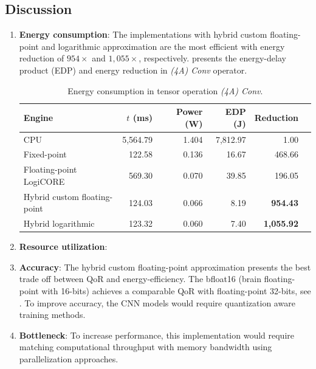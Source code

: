 \subsection{Discussion}
\begin{enumerate}

	\item{\textbf{Energy consumption}}: The implementations with hybrid custom floating-point and logarithmic approximation are the most efficient with energy reduction of $954\times$ and $1,055\times$, respectively.  presents the energy-delay product (EDP) and energy reduction in \emph{(4A) Conv} operator.
	
\begin{table}[!htp]\centering
	\caption{Energy consumption in tensor operation \emph{(4A) Conv}.}\label{tab:edp}
	\scriptsize
	\begin{tabular}{lrrrrr}\toprule
		\textbf{Engine} & \textbf{$t$ (ms)} &\textbf{Power (W)} &\textbf{EDP (J)} &\textbf{Reduction} \\\midrule
		CPU &5,564.79 &1.404 &7,812.97 &1.00 \\
		Fixed-point &122.58 &0.136 &16.67 &468.66 \\
		Floating-point LogiCORE &569.30 &0.070 &39.85 &196.05 \\
		Hybrid custom floating-point &124.03 &0.066 &8.19 &\textbf{954.43} \\
		Hybrid logarithmic &123.32 &0.060 &7.40 &\textbf{1,055.92 }\\
		\bottomrule
	\end{tabular}
\end{table}
	
	\item{\textbf{Resource utilization}}: 
	
	\item{\textbf{Accuracy}}: The hybrid custom floating-point approximation presents the best trade off between QoR and energy-efficiency. The bfloat16 (brain floating-point with 16-bits) achieves a comparable QoR with floating-point 32-bits, see . To improve accuracy, the CNN models would require quantization aware training methods.
	
	\item{\textbf{Bottleneck}}: To increase performance, this implementation would require matching computational throughput with memory bandwidth using parallelization approaches.
\end{enumerate}